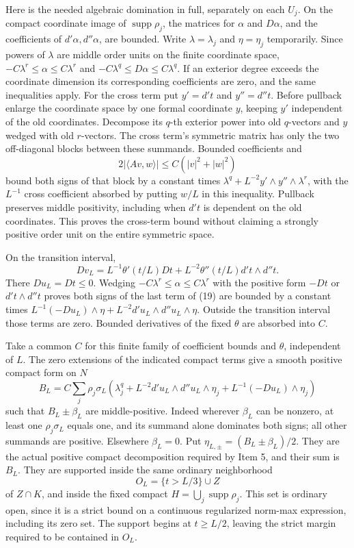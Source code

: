 \documentclass[11pt]{article}
\begin{document}
Here is the needed algebraic domination in full, separately on each \(U_j\). On the compact coordinate image of \(\operatorname{supp}\rho_j\), the matrices for \(\alpha\) and \(D\alpha\), and the coefficients of \(d'\alpha,d''\alpha\), are bounded. Write \(\lambda=\lambda_j\) and \(\eta=\eta_j\) temporarily. Since powers of \(\lambda\) are middle order units on the finite coordinate space, \(-C\lambda^r\leq\alpha\leq C\lambda^r\) and \(-C\lambda^q\leq D\alpha\leq C\lambda^q\). If an exterior degree exceeds the coordinate dimension its corresponding coefficients are zero, and the same inequalities apply. For the cross term put \(y'=d't\) and \(y''=d''t\). Before pullback enlarge the coordinate space by one formal coordinate \(y\), keeping \(y'\) independent of the old coordinates. Decompose its \(q\)-th exterior power into old \(q\)-vectors and \(y\) wedged with old \(r\)-vectors. The cross term's symmetric matrix has only the two off-diagonal blocks between these summands. Bounded coefficients and
\[
 2|\langle A v,w\rangle|\leq C(|v|^2+|w|^2)
\]
bound both signs of that block by a constant times \(\lambda^q+L^{-2}y'\wedge y''\wedge\lambda^r\), with the \(L^{-1}\) cross coefficient absorbed by putting \(w/L\) in this inequality. Pullback preserves middle positivity, including when \(d't\) is dependent on the old coordinates. This proves the cross-term bound without claiming a strongly positive order unit on the entire symmetric space.

On the transition interval,
\[
 Dv_L=L^{-1}\theta'(t/L)Dt
      +L^{-2}\theta''(t/L)d't\wedge d''t.
\]
There \(Du_L=Dt\leq0\). Wedging \(-C\lambda^r\leq\alpha\leq C\lambda^r\) with the positive form \(-Dt\) or \(d't\wedge d''t\) proves both signs of the last term of (19) are bounded by a constant times \(L^{-1}(-Du_L)\wedge\eta+L^{-2}d'u_L\wedge d''u_L\wedge\eta\). Outside the transition interval those terms are zero. Bounded derivatives of the fixed \(\theta\) are absorbed into \(C\).

Take a common \(C\) for this finite family of coefficient bounds and \(\theta\), independent of \(L\). The zero extensions of the indicated compact terms give a smooth positive compact form on \(N\)
\[
 B_L=C\sum_j\rho_j\sigma_L\left(
 \lambda_j^q+L^{-2}d'u_L\wedge d''u_L\wedge\eta_j
          +L^{-1}(-Du_L)\wedge\eta_j\right)
\tag{20}
\]
such that \(B_L\pm\beta_L\) are middle-positive. Indeed wherever \(\beta_L\) can be nonzero, at least one \(\rho_j\sigma_L\) equals one, and its summand alone dominates both signs; all other summands are positive. Elsewhere \(\beta_L=0\). Put \(\eta_{L,\pm}=(B_L\pm\beta_L)/2\). They are the actual positive compact decomposition required by Item 5, and their sum is \(B_L\). They are supported inside the same ordinary neighborhood
\[
 O_L=\{t>L/3\}\cup Z
\]
of \(Z\cap K\), and inside the fixed compact \(H=\bigcup_j\operatorname{supp}\rho_j\). This set is ordinary open, since it is a strict bound on a continuous regularized norm-max expression, including its zero set. The support begins at \(t\geq L/2\), leaving the strict margin required to be contained in \(O_L\).
\end{document}
